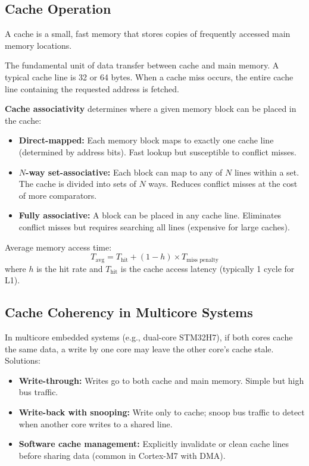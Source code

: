 \subsection{Cache Operation}

A cache is a small, fast memory that stores copies of frequently accessed main memory locations.

\begin{definition}
The fundamental unit of data transfer between cache and main memory. A typical cache line is 32 or 64 bytes. When a cache miss occurs, the entire cache line containing the requested address is fetched.
\end{definition}

\textbf{Cache associativity} determines where a given memory block can be placed in the cache:

\begin{itemize}
  \item \textbf{Direct-mapped:} Each memory block maps to exactly one cache line (determined by address bits). Fast lookup but susceptible to conflict misses.
  \item \textbf{$N$-way set-associative:} Each block can map to any of $N$ lines within a set. The cache is divided into sets of $N$ ways. Reduces conflict misses at the cost of more comparators.
  \item \textbf{Fully associative:} A block can be placed in any cache line. Eliminates conflict misses but requires searching all lines (expensive for large caches).
\end{itemize}

\begin{important}
Average memory access time:
\[
  T_{\text{avg}} = T_{\text{hit}} + (1 - h) \times T_{\text{miss penalty}}
\]
where $h$ is the hit rate and $T_{\text{hit}}$ is the cache access latency (typically 1 cycle for L1).
\end{important}

\subsection{Cache Coherency in Multicore Systems}

In multicore embedded systems (e.g., dual-core STM32H7), if both cores cache the same data, a write by one core may leave the other core's cache stale. Solutions:
\begin{itemize}
  \item \textbf{Write-through:} Writes go to both cache and main memory. Simple but high bus traffic.
  \item \textbf{Write-back with snooping:} Write only to cache; snoop bus traffic to detect when another core writes to a shared line.
  \item \textbf{Software cache management:} Explicitly invalidate or clean cache lines before sharing data (common in Cortex-M7 with DMA).
\end{itemize}

